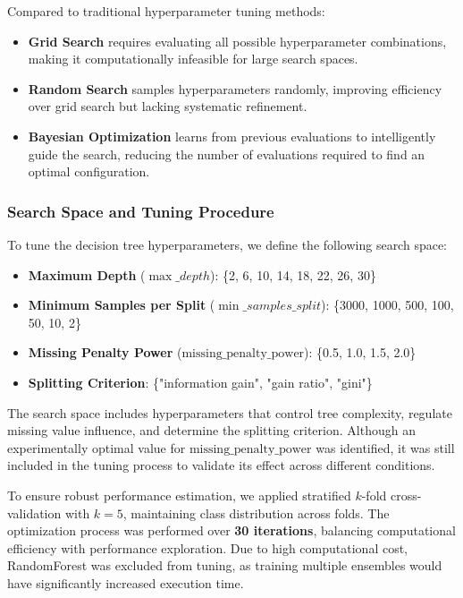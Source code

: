 \documentclass[12pt]{article}
\begin{document}
Compared to traditional hyperparameter tuning methods:
\begin{itemize}
    \item \textbf{Grid Search} requires evaluating all possible hyperparameter combinations, making it computationally infeasible for large search spaces.
    \item \textbf{Random Search} samples hyperparameters randomly, improving efficiency over grid search but lacking systematic refinement.
    \item \textbf{Bayesian Optimization} learns from previous evaluations to intelligently guide the search, reducing the number of evaluations required to find an optimal configuration.
\end{itemize}

\subsubsection{Search Space and Tuning Procedure}

To tune the decision tree hyperparameters, we define the following search space:

\begin{itemize}
    \item \textbf{Maximum Depth} ($\max\_depth$): \{2, 6, 10, 14, 18, 22, 26, 30\}
    \item \textbf{Minimum Samples per Split} ($\min\_samples\_split$): \{3000, 1000, 500, 100, 50, 10, 2\}
    \item \textbf{Missing Penalty Power} ($\text{missing\_penalty\_power}$): \{0.5, 1.0, 1.5, 2.0\}
    \item \textbf{Splitting Criterion}: \{"information gain", "gain ratio", "gini"\}
\end{itemize}

The search space includes hyperparameters that control tree complexity, regulate missing value influence, and determine the splitting criterion. Although an experimentally optimal value for $\text{missing\_penalty\_power}$ was identified, it was still included in the tuning process to validate its effect across different conditions.

To ensure robust performance estimation, we applied stratified $k$-fold cross-validation with $k=5$, maintaining class distribution across folds. The optimization process was performed over \textbf{30 iterations}, balancing computational efficiency with performance exploration. Due to high computational cost, RandomForest was excluded from tuning, as training multiple ensembles would have significantly increased execution time.
\end{document}
